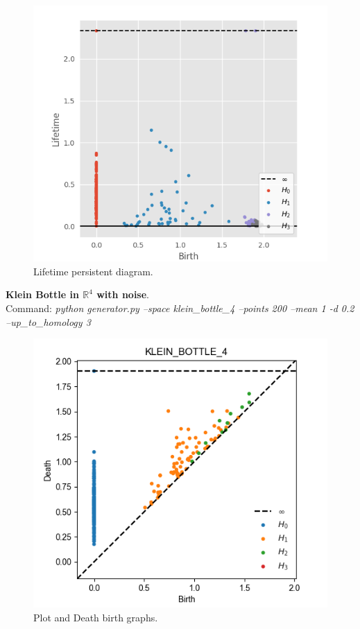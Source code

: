 \documentclass[11pt,a4paper]{report}
\begin{document}
              \begin{figure}[H]
                \centering
                \includegraphics[width=0.5\linewidth, scale=0.5]{./ripser/on_klein4_lifetime.png}
                \caption{Lifetime persistent diagram.}
                \label{fig:sep hom}
              \end{figure}
              
             \textbf{Klein Bottle in $\mathbb{R}^4$ with noise}.\\
              Command: \textit{python generator.py --space klein\_bottle\_4 --points 200 --mean 1 -d 0.2 --up\_to\_homology 3}

                \begin{figure}[H]
                \centering
                \includegraphics[width=\linewidth]{./ripser/klein4.png}
                \caption{Plot and Death birth graphs.}
                \label{fig:sep hom}
              \end{figure}
\end{document}
